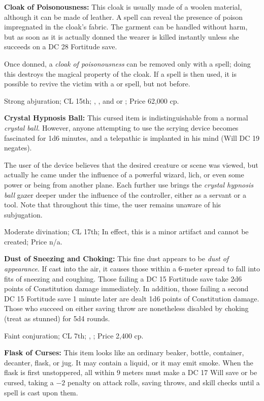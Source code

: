 \textbf{Cloak of Poisonousness:} This cloak is usually made of a woolen material, although it can be made of leather. A  spell can reveal the presence of poison impregnated in the cloak's fabric. The garment can be handled without harm, but as soon as it is actually donned the wearer is killed instantly unless she succeeds on a DC 28 Fortitude save.

Once donned, a \emph{cloak of poisonousness} can be removed only with a  spell; doing this destroys the magical property of the cloak. If a  spell is then used, it is possible to revive the victim with a  or  spell, but not before.

Strong abjuration; CL 15th; , , and  or ; Price 62,000 cp.

\textbf{Crystal Hypnosis Ball:} This cursed item is indistinguishable from a normal \emph{crystal ball}. However, anyone attempting to use the scrying device becomes fascinated for 1d6 minutes, and a telepathic  is implanted in his mind (Will DC 19 negates).

The user of the device believes that the desired creature or scene was viewed, but actually he came under the influence of a powerful wizard, lich, or even some power or being from another plane. Each further use brings the \emph{crystal hypnosis ball} gazer deeper under the influence of the controller, either as a servant or a tool. Note that throughout this time, the user remains unaware of his subjugation.

Moderate divination; CL 17th; In effect, this is a minor artifact and cannot be created; Price n/a.

\textbf{Dust of Sneezing and Choking:} This fine dust appears to be \emph{dust of appearance}. If cast into the air, it causes those within a 6-meter spread to fall into fits of sneezing and coughing. Those failing a DC 15 Fortitude save take 2d6 points of Constitution damage immediately. In addition, those failing a second DC 15 Fortitude save 1 minute later are dealt 1d6 points of Constitution damage. Those who succeed on either saving throw are nonetheless disabled by choking (treat as stunned) for 5d4 rounds.

Faint conjuration; CL 7th; , ; Price 2,400 cp.

\textbf{Flask of Curses:} This item looks like an ordinary beaker, bottle, container, decanter, flask, or jug. It may contain a liquid, or it may emit smoke. When the flask is first unstoppered, all within 9 meters must make a DC 17 Will save or be cursed, taking a $-2$ penalty on attack rolls, saving throws, and skill checks until a  spell is cast upon them.

